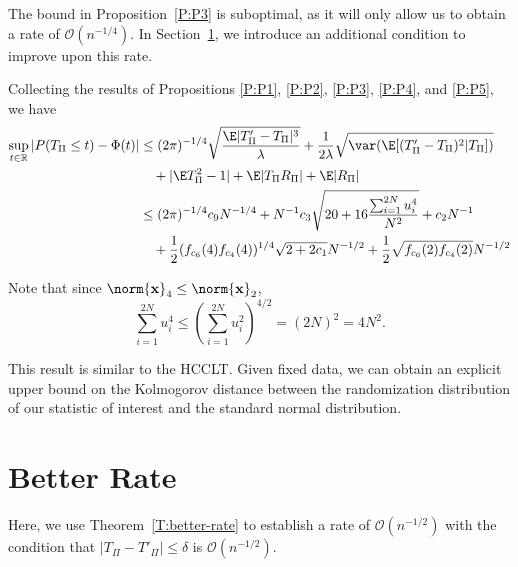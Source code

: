 The bound in Proposition~\ref{P:P3} is suboptimal, as it will only allow us to
obtain a rate of $\mathcal{O}(n^{-1/4})$.  In Section~\ref{S:better-rate}, we
introduce an additional condition to improve upon this rate.

Collecting the results of Propositions \ref{P:P1}, \ref{P:P2}, \ref{P:P3},
\ref{P:P4}, and \ref{P:P5}, we have
\begin{equation*}
  \begin{split}
    \sup_{t \in \mathbb{R}} |P(T_{\Pi} \leq t) - \Phi(t)|
    &\leq (2\pi)^{-1/4} \sqrt{\frac{\E |T_{\Pi}'-T_{\Pi}|^3}{\lambda}}
    + \frac{1}{2\lambda} \sqrt{\var (\E [(T_{\Pi}'-T_{\Pi})^2|T_{\Pi}])} \\
    &\quad + |\E T_{\Pi}^2 - 1| + \E |T_{\Pi}R_{\Pi}| + \E |R_{\Pi}| \\
    &\leq  (2\pi)^{-1/4} c_9 N^{-1/4} +
    N^{-1} c_3\sqrt{20 + 16\frac{\sum_{i=1}^{2N} u_{i}^4}{N^2}} + c_2 N^{-1} \\
    &\quad + \frac{1}{2}(f_{c_6}(4)f_{c_4}(4))^{1/4} \sqrt{2+2c_1} N^{-1/2} +
    \frac{1}{2}\sqrt{f_{c_6}(2)f_{c_4}(2)} N^{-1/2}
  \end{split}
\end{equation*}

Note that since $\norm{{\bf x}}_4 \leq \norm{{\bf x}}_2$,
\begin{equation*}
  \sum_{i=1}^{2N} u_{i}^4 \leq \left ( \sum_{i=1}^{2N} u_{i}^2 \right )^{4/2} = (2N)^2 = 4N^2.
\end{equation*}

This result is similar to the HCCLT.  Given fixed data, we can obtain an explicit
upper bound on the Kolmogorov distance between the randomization distribution of
our statistic of interest and the standard normal distribution.

\section{Better Rate}
\label{S:better-rate}
Here, we use Theorem~\ref{T:better-rate} to establish a rate of
$\mathcal{O}(n^{-1/2})$ with the condition that $|T_{\Pi}-T'_{\Pi}| \leq \delta$
is $\mathcal{O}(n^{-1/2})$.

